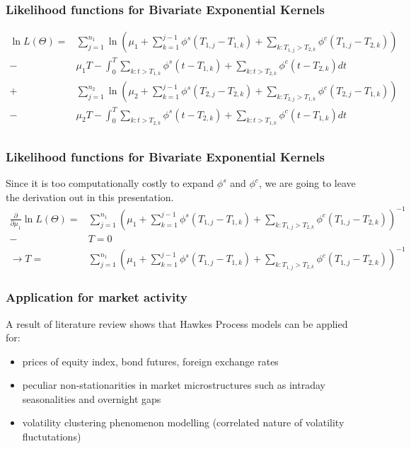\documentclass{beamer}
\begin{document}
\begin{frame}
\frametitle{Likelihood functions for Bivariate Exponential Kernels}
\begin{equation*}
\begin{split}
\ln L(\Theta) = & \sum_{j=1}^{n_1} \ln \left(\mu_1 + \sum_{k=1}^{j-1} \phi^s(T_{1,j} - T_{1,k}) + \sum_{k: T_{1,j}>T_{2,k}} \phi^{c}(T_{1,j} - T_{2,k}) \right) \\
- &\mu_1 T - \int_{0}^{T} \sum_{k: t>T_{1,k}} \phi^s(t - T_{1,k}) + \sum_{k: t>T_{2,k}} \phi^{c}(t - T_{2,k}) dt \\
+&\sum_{j=1}^{n_2} \ln \left(\mu_2 + \sum_{k=1}^{j-1} \phi^s(T_{2,j} - T_{2,k}) + \sum_{k: T_{2,j}>T_{1,k}} \phi^{c}(T_{2,j} - T_{1,k}) \right) \\
- & \mu_2 T - \int_{0}^{T} \sum_{k: t>T_{2,k}} \phi^s(t - T_{2,k}) + \sum_{k: t>T_{1,k}} \phi^{c}(t - T_{1,k}) dt\\
\end{split}
\end{equation*}
\end{frame}

\begin{frame}
\frametitle{Likelihood functions for Bivariate Exponential Kernels}
Since it is too computationally costly to expand $\phi^s$ and $\phi^c$, we are going to leave the derivation out in this presentation.
\begin{equation*}
\begin{split}
\frac{\partial}{\partial \mu_1} \ln L(\Theta) = & \sum_{j=1}^{n_1} \left(\mu_1 + \sum_{k=1}^{j-1} \phi^s(T_{1,j} - T_{1,k}) + \sum_{k: T_{1,j}>T_{2,k}} \phi^{c}(T_{1,j} - T_{2,k}) \right)^{-1} \\
- & T = 0\\
\to T = &\sum_{j=1}^{n_1} \left(\mu_1 + \sum_{k=1}^{j-1} \phi^s(T_{1,j} - T_{1,k}) + \sum_{k: T_{1,j}>T_{2,k}} \phi^{c}(T_{1,j} - T_{2,k}) \right)^{-1}
\end{split}
\end{equation*}
\end{frame}

\begin{frame}
\frametitle{Application for market activity}
A result of literature review shows that Hawkes Process models can be applied for:
\begin{itemize}
	\item prices of equity index, bond futures, foreign exchange rates
	\item peculiar non-stationarities in market microstructures such as intraday seasonalities and overnight gaps
	\item volatility clustering phenomenon modelling (correlated nature of volatility fluctutations)
\end{itemize}
\end{frame}
\end{document}
